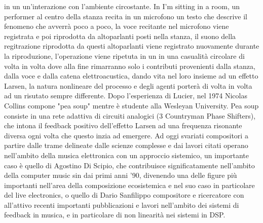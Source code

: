 in un un'interazione con l'ambiente circostante.
In I'm sitting in a room, un performer al centro della stanza
recita in un microfono un testo che descrive il fenomeno che avverrà poco a poco,
la voce recitante nel microfono viene registrata e poi riprodotta da altoparlanti
posti nella stanza, il suono della regitrazione riprodotta da questi altoparlanti
viene registrato nuovamente durante la riproduzione, l'operazione
viene ripetuta in un in una casualità circolare di volta in volta dove alla fine rimarranno
solo i contributi provenienti dalla stanza, dalla voce e dalla catena elettroacustica,
dando vita nel loro insieme ad un effetto Larsen, la natura
nonlineare del processo e degli agenti porterà di volta in volta ad un risutato
sempre differente.
Dopo l'esperienza di Lucier, nel 1974 Nicolas Collins compone "pea soup"
mentre è studente alla Wesleyan University.
Pea soup consiste in una rete adattiva di circuiti analogici (3 Countryman Phase Shifters),
che intona il feedback positivo dell'effetto Larsen ad una frequenza risonante diversa
ogni volta che questo inzia ad emergere.
Ad oggi svariati compositori a partire dalle trame delineate dalle scienze complesse e
dai lavori citati operano nell'ambito della musica elettronica con un approccio sistemico,
un importante caso è quello di Agostino Di Scipio, che contribuisce significatamente
nell'ambito della computer music sin dai primi anni '90, divenendo una
delle figure più importanti nell'area della composizione ecosistemica e nel suo
caso in particolare del live electronics, o quello di Dario Sanfilippo
compositore e ricercatore con all'attivo recenti importanti pubblicazioni e lavori
nell'ambito dei sistemi di feedback in musica, e in particolare di non linearità nei sistemi
in DSP.
